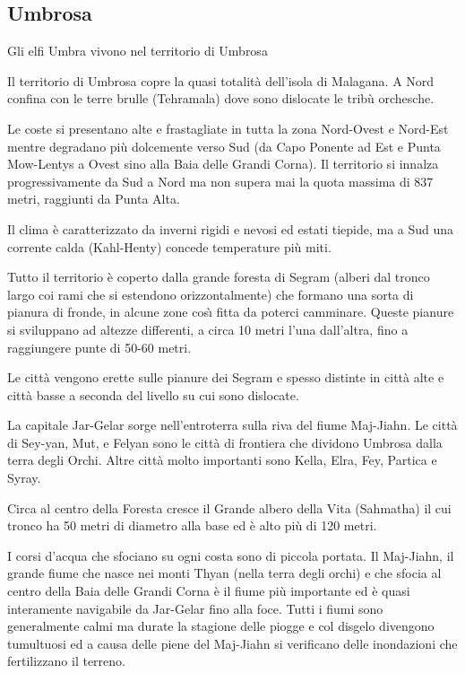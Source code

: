 \subsection{Umbrosa}


Gli elfi Umbra vivono nel territorio di Umbrosa

\Geografia Il territorio di Umbrosa copre la quasi totalit\`a dell'isola di Malagana. A
Nord confina con le terre brulle (Tehramala) dove sono dislocate le trib\`u
orchesche.

Le coste si presentano alte e frastagliate in tutta la zona Nord-Ovest
e Nord-Est mentre degradano pi\`u dolcemente verso Sud (da Capo
Ponente ad Est e Punta Mow-Lentys a Ovest sino alla Baia delle Grandi
Corna). Il territorio si innalza progressivamente da Sud a Nord ma non
supera mai la quota massima di 837 metri, raggiunti da Punta Alta.

Il clima \`e caratterizzato da inverni rigidi e nevosi ed estati
tiepide, ma a Sud una corrente calda (Kahl-Henty) concede temperature
pi\`u miti.

Tutto il territorio \`e coperto dalla grande foresta di Segram
(alberi dal tronco largo coi rami che si estendono orizzontalmente)
che formano una sorta di pianura di fronde, in alcune zone
cos\`{\i} fitta da poterci camminare.  Queste pianure si sviluppano ad
altezze differenti, a circa 10 metri l'una dall'altra, fino a
raggiungere punte di 50-60 metri.

Le citt\`a vengono erette sulle pianure dei Segram e spesso distinte
in citt\`a alte e citt\`a basse a seconda del livello su cui sono
dislocate. 

La capitale Jar-Gelar sorge nell'entroterra sulla riva del
fiume Maj-Jiahn. Le citt\`a di Sey-yan, Mut, e Felyan sono le citt\`a
di frontiera che dividono Umbrosa dalla terra degli Orchi.  Altre
citt\`a molto importanti sono Kella, Elra, Fey, Partica e Syray.

Circa al centro della Foresta cresce il Grande albero della Vita
(Sahmatha) il cui tronco ha 50 metri di diametro alla base ed \`e alto
pi\`u di 120 metri.

I corsi d'acqua che sfociano su ogni costa sono di piccola portata. Il
Maj-Jiahn, il grande fiume che nasce nei monti Thyan (nella terra
degli orchi) e che sfocia al centro della Baia delle Grandi Corna \`e
il fiume pi\`u importante ed \`e quasi interamente navigabile da
Jar-Gelar fino alla foce. Tutti i fiumi sono generalmente calmi ma
durate la stagione delle piogge e col disgelo divengono tumultuosi ed
a causa delle piene del Maj-Jiahn si verificano delle inondazioni che
fertilizzano il terreno.

